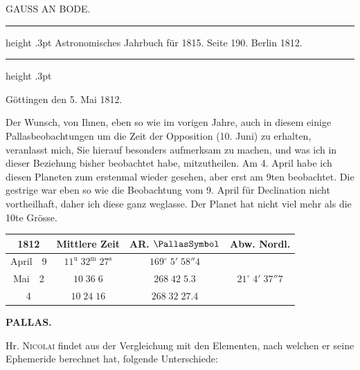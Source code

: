 \par\bigskip
{}
\hypertarget{native-356-lower}{}\label{native-356-lower}
\begin{center}\large GAUSS AN BODE.\end{center}
\begin{center}
\parbox{.70\linewidth}{%
\centering\fontsize{8.2}{10.2}\selectfont
\hrule height .3pt\relax\vspace{2.5pt}
Astronomisches Jahrbuch für 1815. Seite 190. Berlin 1812.\par
\vspace{2.5pt}\hrule height .3pt\relax
}
\end{center}

\begin{flushright}Göttingen den 5. Mai 1812.\end{flushright}
\par\indent Der Wunsch, von Ihnen, eben so wie im vorigen Jahre, auch in diesem einige Pallasbeobachtungen um die Zeit der Opposition (10. Juni) zu erhalten, veranlasst mich, Sie hierauf besonders aufmerksam zu machen, und was ich in dieser Beziehung bisher beobachtet habe, mitzutheilen. Am 4. April habe ich diesen Planeten zum erstenmal wieder gesehen, aber erst am 9ten beobachtet. Die gestrige war eben so wie die Beobachtung vom 9. April für Declination nicht vortheilhaft, daher ich diese ganz weglasse. Der Planet hat nicht viel mehr als die 10te Grösse.

\begin{center}
\fontsize{10}{12}\selectfont\setlength{\tabcolsep}{3pt}\renewcommand{\arraystretch}{1.15}\begin{tabular}{c|c|c|c}
1812 & Mittlere Zeit & AR. $\PallasSymbol$ & Abw. Nordl. \\
\hline
April\ \ 9 & $11^{\mathrm u}\;32^{\mathrm m}\;27^{\mathrm s}$ & $169^\circ\;5'\;58''4$ & \\
Mai\ \ 2 & $10\;36\;6$ & $268\;42\;5.3$ & $21^\circ\;4'\;37''7$ \\
4 & $10\;24\;16$ & $268\;32\;27.4$ & \\
\end{tabular}
\end{center}
\clearpage
\thispagestyle{empty}
\noindent{}%
%
\parbox[t]{\dimexpr\linewidth-24mm\relax}{\centering\footnotesize\bfseries PALLAS.\par}%
\makebox[12mm][r]{}\par\nobreak\medskip
\par\indent Hr. \textsc{Nicolai} findet aus der Vergleichung mit den Elementen, nach welchen er seine Ephemeride berechnet hat, folgende Unterschiede:

